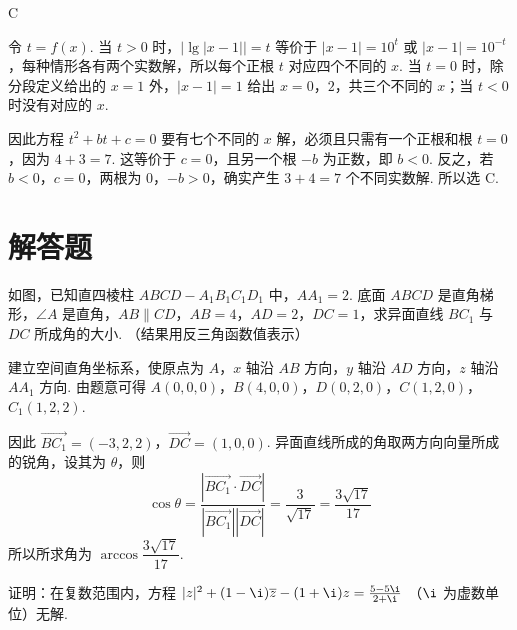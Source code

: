 \begin{answer}
C
\end{answer}

\begin{solution}
令 \(t=f(x)\). 当 \(t>0\) 时，\(\lvert\lg\lvert x-1\rvert\rvert=t\) 等价于 \(\lvert x-1\rvert=10^t\) 或 \(\lvert x-1\rvert=10^{-t}\)，每种情形各有两个实数解，所以每个正根 \(t\) 对应四个不同的 \(x\). 当 \(t=0\) 时，除分段定义给出的 \(x=1\) 外，\(\lvert x-1\rvert=1\) 给出 \(x=0\)，\(2\)，共三个不同的 \(x\)；当 \(t<0\) 时没有对应的 \(x\).

因此方程 \(t^2+bt+c=0\) 要有七个不同的 \(x\) 解，必须且只需有一个正根和根 \(t=0\)，因为 \(4+3=7\). 这等价于 \(c=0\)，且另一个根 \(-b\) 为正数，即 \(b<0\). 反之，若 \(b<0\)，\(c=0\)，两根为 \(0\)，\(-b>0\)，确实产生 \(3+4=7\) 个不同实数解. 所以选 C.
\end{solution}

\section{解答题}
\begin{problem}
如图，已知直四棱柱 \(ABCD - A_{1}B_{1}C_{1}D_{1}\) 中，\(AA_{1} = 2\). 底面 \(ABCD\) 是直角梯形，\(\angle A\) 是直角，\(AB \parallel CD\)，\(AB = 4\)，\(AD = 2\)，\(DC = 1\)，求异面直线 \(BC_{1}\) 与 \(DC\) 所成角的大小. （结果用反三角函数值表示）

\end{problem}

\begin{solution}
建立空间直角坐标系，使原点为 \(A\)，\(x\) 轴沿 \(AB\) 方向，\(y\) 轴沿 \(AD\) 方向，\(z\) 轴沿 \(AA_{1}\) 方向. 由题意可得 \(A(0,0,0)\)，\(B(4,0,0)\)，\(D(0,2,0)\)，\(C(1,2,0)\)，\(C_{1}(1,2,2)\).

因此 \(\overrightarrow{BC_{1}}=(-3,2,2)\)，\(\overrightarrow{DC}=(1,0,0)\).
异面直线所成的角取两方向向量所成的锐角，设其为 \(\theta\)，则
\[
\cos\theta=\frac{\left|\overrightarrow{BC_{1}}\cdot\overrightarrow{DC}\right|}{\left|\overrightarrow{BC_{1}}\right|\left|\overrightarrow{DC}\right|}
=\frac{3}{\sqrt{17}}=\frac{3\sqrt{17}}{17}
\]
所以所求角为 \(\arccos\dfrac{3\sqrt{17}}{17}\).
\end{solution}

\begin{problem}
证明：在复数范围内，方程 \(|z|^2 + (1 - \i)\overline{z} - (1 + \i)z = \frac{5 - 5\i}{2 + \i}\) （\(\i\) 为虚数单位）无解.
\end{problem}


